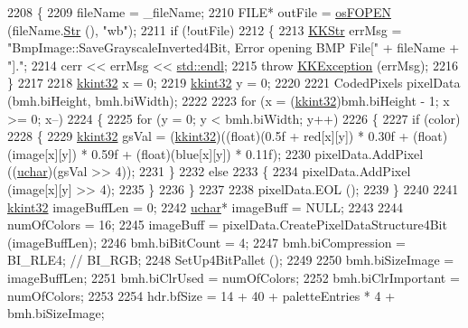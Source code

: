 \begin{DoxyCode}
2208 \{
2209   fileName = \_fileName;
2210   FILE*  outFile = \hyperlink{namespace_k_k_b_abf4050d2916ded8349dafadc80f0ecd1}{osFOPEN} (fileName.\hyperlink{class_k_k_b_1_1_k_k_str_ad574e6c0fe7f6ce1ba3ab0a8ce2fbd52}{Str} (), \textcolor{stringliteral}{"wb"});
2211   \textcolor{keywordflow}{if}  (!outFile)
2212   \{
2213     \hyperlink{class_k_k_b_1_1_k_k_str}{KKStr}  errMsg = \textcolor{stringliteral}{"BmpImage::SaveGrayscaleInverted4Bit,  Error opening BMP File["} + fileName + \textcolor{stringliteral}{"]."};
2214     cerr << errMsg << \hyperlink{namespace_k_k_b_ad1f50f65af6adc8fa9e6f62d007818a8}{std::endl};
2215     \textcolor{keywordflow}{throw} \hyperlink{class_k_k_b_1_1_k_k_exception}{KKException} (errMsg);
2216   \}
2217 
2218   \hyperlink{namespace_k_k_b_a8fa4952cc84fda1de4bec1fbdd8d5b1b}{kkint32}  x = 0;
2219   \hyperlink{namespace_k_k_b_a8fa4952cc84fda1de4bec1fbdd8d5b1b}{kkint32}  y = 0;
2220 
2221   CodedPixels pixelData (bmh.biHeight, bmh.biWidth);
2222 
2223   \textcolor{keywordflow}{for}  (x = (\hyperlink{namespace_k_k_b_a8fa4952cc84fda1de4bec1fbdd8d5b1b}{kkint32})bmh.biHeight - 1; x >= 0; x--)
2224   \{
2225     \textcolor{keywordflow}{for}  (y = 0; y < bmh.biWidth; y++)
2226     \{
2227       \textcolor{keywordflow}{if}  (color)
2228       \{
2229         \hyperlink{namespace_k_k_b_a8fa4952cc84fda1de4bec1fbdd8d5b1b}{kkint32}  gsVal = (\hyperlink{namespace_k_k_b_a8fa4952cc84fda1de4bec1fbdd8d5b1b}{kkint32})((\textcolor{keywordtype}{float})(0.5f + red[x][y]) * 0.30f + (\textcolor{keywordtype}{float})(image[x][y]) *
       0.59f + (\textcolor{keywordtype}{float})(blue[x][y]) * 0.11f);
2230         pixelData.AddPixel ((\hyperlink{namespace_k_k_b_ace9969169bf514f9ee6185186949cdf7}{uchar})(gsVal >> 4));
2231       \}
2232       \textcolor{keywordflow}{else}
2233       \{
2234         pixelData.AddPixel (image[x][y] >> 4);
2235       \}
2236     \}
2237 
2238     pixelData.EOL ();
2239   \}
2240 
2241   \hyperlink{namespace_k_k_b_a8fa4952cc84fda1de4bec1fbdd8d5b1b}{kkint32} imageBuffLen  = 0;
2242   \hyperlink{namespace_k_k_b_ace9969169bf514f9ee6185186949cdf7}{uchar}*  imageBuff     = NULL;
2243 
2244   numOfColors = 16;
2245   imageBuff = pixelData.CreatePixelDataStructure4Bit (imageBuffLen);
2246   bmh.biBitCount    = 4;
2247   bmh.biCompression = BI\_RLE4; \textcolor{comment}{// BI\_RGB;}
2248   SetUp4BitPallet ();
2249 
2250   bmh.biSizeImage    = imageBuffLen; 
2251   bmh.biClrUsed      = numOfColors;
2252   bmh.biClrImportant = numOfColors;
2253 
2254   hdr.bfSize = 14 + 40 + paletteEntries * 4 + bmh.biSizeImage;

\end{DoxyCode}
